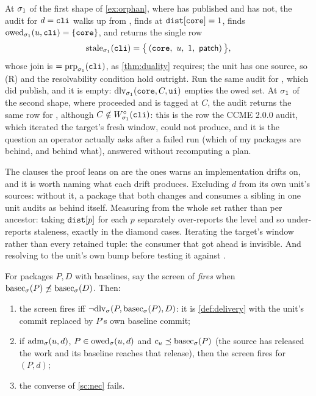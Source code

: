 \begin{example}
\label{ex:stale}
At $\sigma_1$ of the first shape of \cref{ex:orphan}, where  has
published and  has not, the audit for $d = \texttt{cli}$ walks up from
, finds  at $\texttt{dist}[\texttt{core}] = 1$, finds
$\mathrm{owed}_{\sigma_1}(u,\texttt{cli}) = \{\texttt{core}\}$, and returns the single row
\[
  \mathrm{stale}_{\sigma_1}(\texttt{cli}) =
  \bigl\{\,(\texttt{core},\ u,\ 1,\ \mathsf{patch})\,\bigr\},
\]
whose join is \bpatch{} $= \mathrm{prp}_{\sigma_1}(\texttt{cli})$, as \cref{thm:duality}
requires; the unit has one source, so (R) and the resolvability condition hold
outright. Run the same audit for , which did publish, and it is empty:
$\mathrm{dlv}_{\sigma_1}(\texttt{core},C,\texttt{ui})$ empties the owed set. At $\sigma_1$ of
the second shape, where  proceeded and is tagged at $C$, the audit
returns the same row for , although $C \notin
W^{\circ}_{\sigma_1}(\texttt{cli})$: this is the row the CCME 2.0.0 audit, which
iterated the target's fresh window, could not produce, and it is the question
an operator actually asks after a failed run (which of my packages are behind,
and behind what), answered without recomputing a plan.
\end{example}

The clauses the proof leans on are the ones  warns an
implementation drifts on, and it is worth naming what each drift produces.
Excluding $d$ from its own unit's sources: without it, a package that both
changes and consumes a sibling in one unit audits as behind itself. Measuring
 from the whole set rather than per ancestor: taking
$\texttt{dist}[p]$ for each $p$ separately over-reports the level and so
under-reports staleness, exactly in the diamond cases. Iterating the target's
window rather than every retained tuple: the consumer that got ahead is
invisible. And resolving  to the unit's own bump before testing
it against \bnone.

\begin{proposition}
\label{prop:screen}
For packages $P, D$ with baselines, say the screen of 
\emph{fires} when $\mathrm{basec}_{\sigma}(P) \not\preceq \mathrm{basec}_{\sigma}(D)$. Then:
\begin{enumerate}[label=(\alph*),leftmargin=2.4em]
  \item the screen fires iff $\lnot\mathrm{dlv}_{\sigma}(P,\mathrm{basec}_{\sigma}(P),D)$: it is
    \cref{def:delivery} with the unit's commit replaced by $P$'s own baseline
    commit; \label{sc:shape}
  \item if $\mathrm{adm}_{\sigma}(u,d)$, $P \in \mathrm{owed}_{\sigma}(u,d)$ and $c_{u} \preceq
    \mathrm{basec}_{\sigma}(P)$ (the source has released the work and its baseline reaches
    that release), then the screen fires for $(P,d)$; \label{sc:nec}
  \item the converse of \ref{sc:nec} fails. \label{sc:conv}
\end{enumerate}
\end{proposition}


